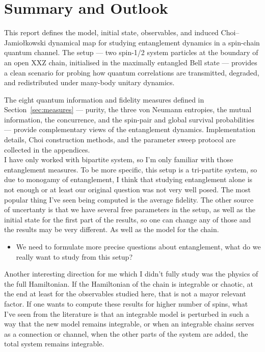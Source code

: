 \documentclass[12pt,a4paper]{article}
\begin{document}
\section{Summary and Outlook}
\label{sec:conclusions}

This report defines the model, initial state, observables, and induced
Choi--Jamio{\l}kowski dynamical map for studying entanglement dynamics in a
spin-chain quantum channel.  The setup — two spin-1/2 system particles at the
boundary of an open XXZ chain, initialised in the maximally entangled Bell
state — provides a clean scenario for probing how quantum correlations are
transmitted, degraded, and redistributed under many-body unitary dynamics.

The eight quantum information and fidelity measures defined in
Section~\ref{sec:measures} — purity, the three von Neumann entropies, the
mutual information, the concurrence, and the spin-pair and global survival
probabilities — provide complementary views of the entanglement dynamics.
Implementation details, Choi construction methods, and the parameter sweep
protocol are collected in the appendices.\\

I have only worked with bipartite system, so I'm only familiar with those entanglement measures. To be more specific, this setup is a tri-partite system, so due to monogamy of entanglement, I think that studying entanglement alone is not enough or at least our original question was not very well posed. The most popular thing I've seen being computed is the average fidelity. The other source of uncertanty is that we have several free parameters in the setup, as well as the initial state for the first part of the results, so one can change any of those and the results may be very different. As well as the model for the chain.

\begin{itemize}
  \item We need to formulate more precise questions about entanglement, what do we really want to study from this setup?
\end{itemize}

Another interesting direction for me which I didn't fully study was the physics of the full Hamiltonian. If the Hamiltonian of the chain is integrable or chaotic, at the end at least for the observables studied here, that is not a mayor relevant factor. If one wants to compute these results for higher number of spins, what I've seen from the literature is that an integrable model is perturbed in such a way that the new model remains integrable, or when an integrable chains serves as a connection or channel, when the other parts of the system are added, the total system remains integrable.
\end{document}
